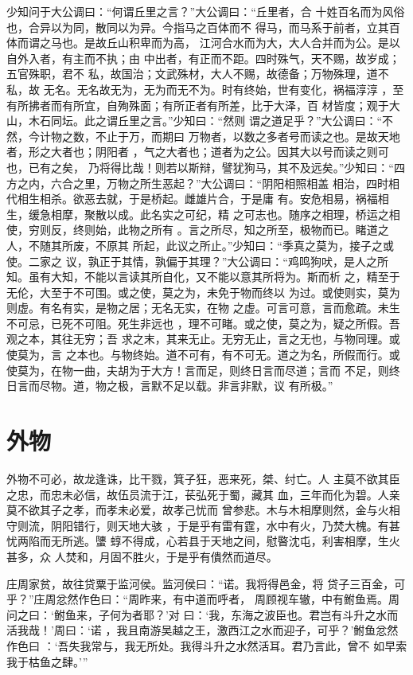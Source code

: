 \documentclass[a4paper,12pt,UTF8,twoside]{ctexbook}
\begin{document}
少知问于大公调曰：“何谓丘里之言？”大公调曰：“丘里者，合 十姓百名而为风俗也，合异以为同，散同以为异。今指马之百体而不 得马，而马系于前者，立其百体而谓之马也。是故丘山积卑而为高， 江河合水而为大，大人合并而为公。是以自外入者，有主而不执；由 中出者，有正而不距。四时殊气，天不赐，故岁成；五官殊职，君不 私，故国治；文武殊材，大人不赐，故德备；万物殊理，道不私，故 无名。无名故无为，无为而无不为。时有终始，世有变化，祸福淳淳 ，至有所拂者而有所宜，自殉殊面；有所正者有所差，比于大泽，百 材皆度；观于大山，木石同坛。此之谓丘里之言。”少知曰：“然则 谓之道足乎？”大公调曰：“不然，今计物之数，不止于万，而期曰 万物者，以数之多者号而读之也。是故天地者，形之大者也；阴阳者 ，气之大者也；道者为之公。因其大以号而读之则可也，已有之矣， 乃将得比哉！则若以斯辩，譬犹狗马，其不及远矣。”少知曰：“四 方之内，六合之里，万物之所生恶起？”大公调曰：“阴阳相照相盖 相治，四时相代相生相杀。欲恶去就，于是桥起。雌雄片合，于是庸 有。安危相易，祸福相生，缓急相摩，聚散以成。此名实之可纪，精 之可志也。随序之相理，桥运之相使，穷则反，终则始，此物之所有 。言之所尽，知之所至，极物而已。睹道之人，不随其所废，不原其 所起，此议之所止。”少知曰：“季真之莫为，接子之或使。二家之 议，孰正于其情，孰偏于其理？”大公调曰：“鸡鸣狗吠，是人之所 知。虽有大知，不能以言读其所自化，又不能以意其所将为。斯而析 之，精至于无伦，大至于不可围。或之使，莫之为，未免于物而终以 为过。或使则实，莫为则虚。有名有实，是物之居；无名无实，在物 之虚。可言可意，言而愈疏。未生不可忌，已死不可阻。死生非远也 ，理不可睹。或之使，莫之为，疑之所假。吾观之本，其往无穷；吾 求之末，其来无止。无穷无止，言之无也，与物同理。或使莫为，言 之本也。与物终始。道不可有，有不可无。道之为名，所假而行。或 使莫为，在物一曲，夫胡为于大方！言而足，则终日言而尽道；言而 不足，则终日言而尽物。道，物之极，言默不足以载。非言非默，议 有所极。”
\section{外物}

外物不可必，故龙逢诛，比干戮，箕子狂，恶来死，桀、纣亡。人 主莫不欲其臣之忠，而忠未必信，故伍员流于江，苌弘死于蜀，藏其 血，三年而化为碧。人亲莫不欲其子之孝，而孝未必爱，故孝己忧而 曾参悲。木与木相摩则然，金与火相守则流，阴阳错行，则天地大骇 ，于是乎有雷有霆，水中有火，乃焚大槐。有甚忧两陷而无所逃。螴 蜳不得成，心若县于天地之间，慰暋沈屯，利害相摩，生火甚多，众 人焚和，月固不胜火，于是乎有僓然而道尽。

庄周家贫，故往贷粟于监河侯。监河侯曰：“诺。我将得邑金，将 贷子三百金，可乎？”庄周忿然作色曰：“周昨来，有中道而呼者， 周顾视车辙，中有鲋鱼焉。周问之曰：‘鲋鱼来，子何为者耶？’对 曰：‘我，东海之波臣也。君岂有斗升之水而活我哉！’周曰：‘诺 ，我且南游吴越之王，激西江之水而迎子，可乎？’鲋鱼忿然作色曰 ：‘吾失我常与，我无所处。我得斗升之水然活耳。君乃言此，曾不 如早索我于枯鱼之肆。’”
\end{document}
